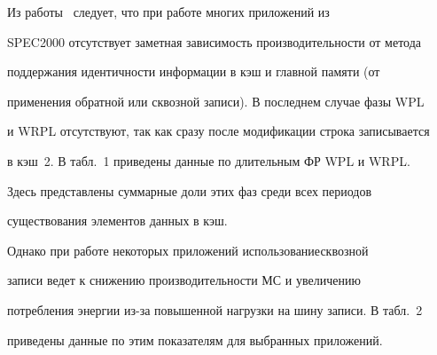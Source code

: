       Из работы~\cite{1-5}  следует, что  при работе многих приложений из 


SPEC2000 отсутствует заметная зависимость производительности от метода 


поддержания идентичности информации в кэш и главной памяти (от 


применения обратной или сквозной записи).  В последнем случае  фазы WPL 


и WRPL отсутствуют, так как  сразу после модификации строка записывается 


в кэш~2. В табл.~1 приведены данные по длительным  ФР WPL и WRPL. 


Здесь представлены суммарные доли этих фаз среди всех периодов 


существования элементов данных в кэш. 








      


      Однако при работе  некоторых приложений использование\linebreak сквозной 


записи  ведет к снижению производительности МС и увеличению 


потребления энергии из-за повышенной нагрузки на шину записи. В табл.~2 


приведены данные по этим показателям для выбранных приложений.





